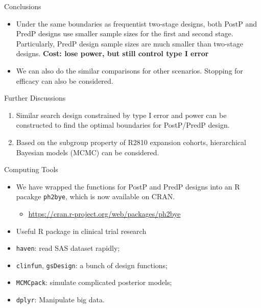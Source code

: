 \begin{frame}

\begin{block}{Conclusions}

\begin{itemize}
\item
  Under the same boundaries as frequentist two-stage designs, both PostP
  and PredP designs use smaller sample sizes for the first and second
  stage. Particularly, PredP design sample sizes are much smaller than
  two-stage designs. \textbf{Cost: lose power, but still control type I
  error}
\item
  We can also do the similar comparisons for other scenarios. Stopping
  for efficacy can also be considered.
\end{itemize}

\end{block}

\begin{block}{Further Discussions}

\begin{enumerate}
\def\labelenumi{\arabic{enumi}.}
\item
  Similar search design constrained by type I error and power can be
  constructed to find the optimal boundaries for PostP/PredP design.
\item
  Based on the subgroup property of R2810 expansion cohorts,
  hierarchical Bayesian models (MCMC) can be considered.
\end{enumerate}

\end{block}

\end{frame}

\begin{frame}{Computing Tools}

\begin{itemize}
\item
  We have wrapped the functions for PostP and PredP designs into an R
  pacakge \texttt{ph2bye}, which is now available on CRAN.

  \begin{itemize}
  \tightlist
  \item
    \url{https://cran.r-project.org/web/packages/ph2bye}
  \end{itemize}
\item
  Useful R package in clinical trial research
\item
  \texttt{haven}: read SAS dataset rapidly;
\item
  \texttt{clinfun}, \texttt{gsDesign}: a bunch of design functions;
\item
  \texttt{MCMCpack}: simulate complicated posterior models;
\item
  \texttt{dplyr}: Manipulate big data.
\end{itemize}

\end{frame}

